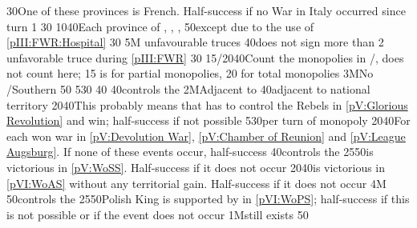 %
%
{}{30}{One of these provinces is French. Half-success if no War in Italy
  occurred since turn 1}%
%
%
%
{}{30}{}%
%
%
%
{10}{40}{Each province of \provinceArtois, \provinceBresse,
  , \provinceRoussillon}%
%
%
%
{}{50}{except due to the use of \ref{pIII:FWR:Hospital}}%
%
%
%
{}{30}{}%
%
%
\EUobjective5M{ unfavourable truces}{}%
{}{40}{\paysmajeurFrance does not sign more than 2 unfavorable truce during
  \ref{pIII:FWR}}%
%
%
%
{}{30}{}%
%
%
%
{15/20}{40}{Count the monopolies in \STZ/\CTZ,  does not count
  here; 15 is for partial monopolies, 20 for total monopolies}%
%
%
\EUobjective3M{No \GE/Southern \HRE}{}%
{}{50}{}%
%
%
{5}{30}{}%
%
%
{}{40}{}%
%
%
%
{}{40}{\paysmajeurFrance controls the }%
%
\EUobjective2M{Adjacent to \paysmajeurHollande}{}%
{}{40}{\paysmajeurFrance adjacent to \paysmajeurHollande national territory}%
%
%
{20}{40}{This probably means that \paysmajeurFrance has to control the Rebels
  in \ref{pV:Glorious Revolution} and win; half-success if not possible}%
%
%
{5}{30}{per turn of  monopoly}%
%
%
{20}{40}{For each won war in \ref{pV:Devolution War}, \ref{pV:Chamber of
    Reunion} and \ref{pV:League Augsburg}. If none of these events occur,
  half-success}%
%
%
%
{}{40}{\paysmajeurFrance controls the }%
%
%
{25}{50}{\FRA is victorious in \ref{pV:WoSS}. Half-success if it does not
  occur}%
%
%
{20}{40}{\FRA is victorious in \ref{pVI:WoAS} without any territorial
  gain. Half-success if it does not occur}%
%
\EUobjective4M{}{}%
{}{50}{\paysmajeurFrance controls the }%
%
%
{25}{50}{Polish King is supported by \FRA in \ref{pVI:WoPS}; half-success if
  this is not possible or if the event does not occur}%
%
%
\EUobjective1M{\payspologne still exists}{}%
{}{50}{}%
